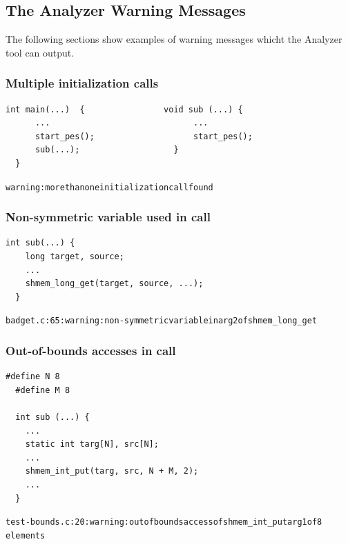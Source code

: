 \subsection{The \openshmem Analyzer Warning Messages}

The following sections show examples of warning messages whicht the Analyzer tool can
output.

\vspace{0.2in}

\begin{minipage}{\linewidth}
\subsubsection{Multiple \openshmem initialization calls}

\begin{lstlisting}[language=OSH+C]
  int main(...)  {                void sub (...) {
      ...                             ...
      start_pes();                    start_pes();       
      sub(...);                   } 
  }
\end{lstlisting}
\begin{alltt}
  warning: more than one \openshmem initialization call found
\end{alltt}
\end{minipage}

\vspace{0.2in}

\begin{minipage}{\linewidth}
\subsubsection{Non-symmetric variable used in \openshmem call}

\begin{lstlisting}[language=OSH+C]
  int sub(...) {
    long target, source;
    ...
    shmem_long_get(target, source, ...);
  }
\end{lstlisting}
\begin{alltt}
  badget.c:65: warning: non-symmetric variable in arg2 of shmem_long_get
\end{alltt}
\end{minipage}

\vspace{0.2in}

\begin{minipage}{\linewidth}
\subsubsection{Out-of-bounds accesses in \openshmem call}

\begin{lstlisting}[language=OSH+C]
  #define N 8
  #define M 8

  int sub (...) {
    ...
    static int targ[N], src[N];
    ...
    shmem_int_put(targ, src, N + M, 2);
    ...
  }
\end{lstlisting}
\begin{alltt}
  test-bounds.c:20: warning: out of bounds access of shmem_int_put arg1 of 8
  elements
\end{alltt}
\end{minipage}


